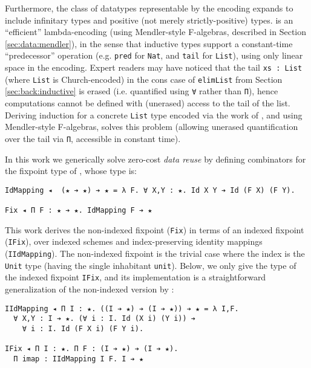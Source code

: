 \documentclass[acmsmall]{acmart}\settopmatter{}
\newcommand{\refsec}[1]{Section \ref{sec:#1}}
\begin{document}
Furthermore, the class of datatypes representable by the
\citet{firsov18b} encoding expands to include infinitary types and
positive (not merely strictly-positive) types. \citet{firsov18b} is an
``efficient'' lambda-encoding (using Mendler-style F-algebras,
described in \refsec{data:mendler}), in the
sense that inductive types support a constant-time ``predecessor''
operation (e.g. \verb;pred; for \verb;Nat;, and \verb;tail; for
\verb;List;), using only linear space in the encoding.
Expert readers may have noticed that the tail \verb;xs : List;
(where \verb;List; is Church-encoded) in
the cons case of \verb;elimList; from \refsec{back:inductive} is
erased (i.e. quantified using \verb;∀; rather than \verb;Π;), hence
computations cannot be defined with (unerased) access to the tail of the
list. Deriving induction for a concrete \verb;List; type
encoded via the work of \citet{firsov18b},
and using Mendler-style F-algebras,
solves this problem (allowing unerased quantification over the tail
via \verb;Π;, accessible in constant time).

In this work we generically solve zero-cost \emph{data reuse} by defining
combinators for the fixpoint type of \citet{firsov18b}, whose type is:
\begin{verbatim}
IdMapping ◂  (★ ➔ ★) ➔ ★ = λ F. ∀ X,Y : ★. Id X Y ➔ Id (F X) (F Y).

Fix ◂ Π F : ★ ➔ ★. IdMapping F ➔ ★
\end{verbatim}
This work derives the non-indexed fixpoint (\verb;Fix;) in terms of an
indexed fixpoint (\verb;IFix;), over indexed schemes and
index-preserving identity mappings (\verb;IIdMapping;). The
non-indexed fixpoint is the trivial case where the index is the
\verb;Unit; type (having the single inhabitant \verb;unit;). Below, we
only give the type of the indexed fixpoint \verb;IFix;, and its
implementation is a straightforward generalization of the non-indexed
version by \citet{firsov18b}:

\begin{verbatim}
IIdMapping ◂ Π I : ★. ((I ➔ ★) ➔ (I ➔ ★)) ➔ ★ = λ I,F. 
  ∀ X,Y : I ➔ ★. (∀ i : I. Id (X i) (Y i)) ➔
    ∀ i : I. Id (F X i) (F Y i).

IFix ◂ Π I : ★. Π F : (I ➔ ★) ➔ (I ➔ ★). 
  Π imap : IIdMapping I F. I ➔ ★
\end{verbatim}
\end{document}
